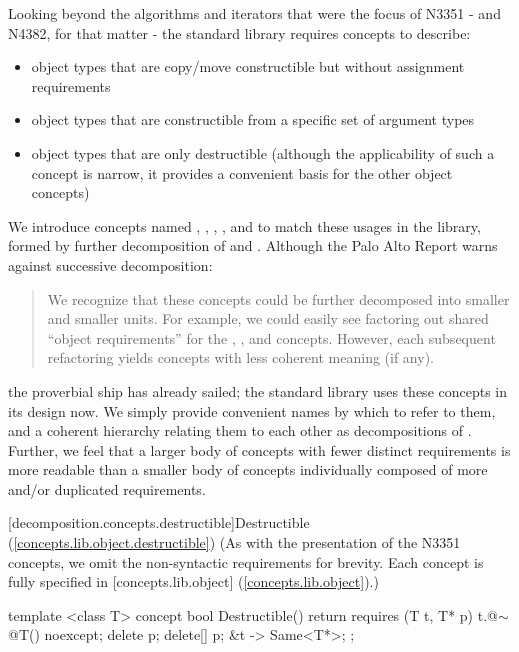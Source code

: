 Looking beyond the algorithms and iterators that were the focus of N3351 - and N4382, for that
matter - the standard library requires concepts to describe:
\begin{itemize}
\item object types that are copy/move constructible but without assignment requirements
\item object types that are constructible from a specific set of argument types
\item object types that are only destructible (although the applicability of such a concept is
narrow, it provides a convenient basis for the other object concepts)
\end{itemize}
We introduce concepts named , ,
, , and  to match these usages
in the library, formed by further decomposition of  and . Although
the Palo Alto Report warns against successive decomposition:
\begin{quote}
We recognize that these concepts could be further decomposed into smaller and smaller units.
For example, we could easily see factoring out shared ``object requirements'' for the
, , and  concepts. However, each subsequent
refactoring yields concepts with less coherent meaning (if any).
\end{quote}
the proverbial ship has already sailed; the standard library uses these concepts in its design
now. We simply provide convenient names by which to refer to them, and a coherent hierarchy
relating them to each other as decompositions of . Further, we feel that a larger
body of concepts with fewer distinct requirements is more readable than a smaller body of concepts
individually composed of more and/or duplicated requirements.

[decomposition.concepts.destructible]{Destructible (\ref{concepts.lib.object.destructible})}
(As with the presentation of the N3351 concepts, we omit the non-syntactic requirements for
brevity. Each concept is fully specified in [concepts.lib.object] (\ref{concepts.lib.object}).)

\begin{codeblock}
template <class T>
concept bool Destructible() {
  return requires (T t, T* p) {
    { t.@$\sim$@T() } noexcept;
    delete p;
    delete[] p;
    { &t } -> Same<T*>;
  };
}
\end{codeblock}

